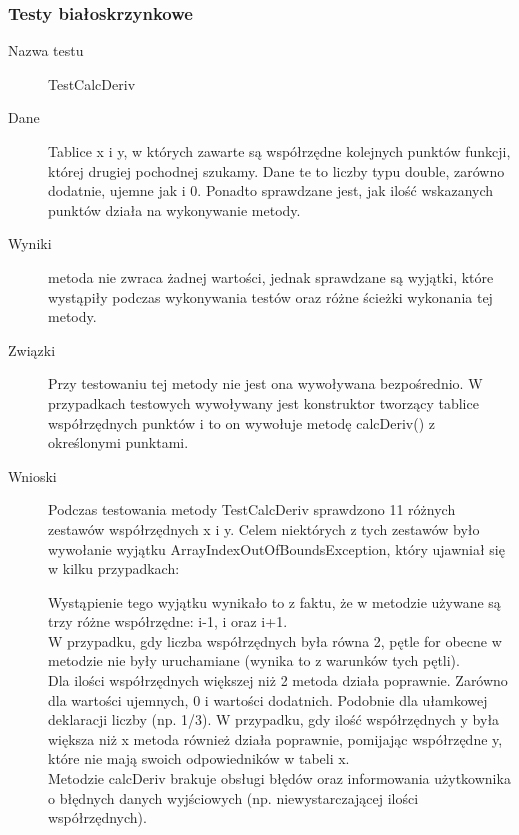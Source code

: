 \documentclass[12pt,a4paper,notitlepage]{article}
\begin{document}
\subsubsection{Testy białoskrzynkowe}
\begin{description}
\item [Nazwa testu] TestCalcDeriv
\item [Dane] Tablice x i y, w których zawarte są współrzędne kolejnych punktów funkcji, której drugiej pochodnej szukamy. Dane te to liczby typu double, zarówno dodatnie, ujemne jak i 0. Ponadto sprawdzane jest, jak ilość wskazanych punktów działa na wykonywanie metody.
\item [Wyniki] metoda nie zwraca żadnej wartości, jednak sprawdzane są wyjątki, które wystąpiły podczas wykonywania testów oraz różne ścieżki wykonania tej metody.
\item [Związki] Przy testowaniu tej metody nie jest ona wywoływana bezpośrednio. W przypadkach testowych wywoływany jest konstruktor tworzący tablice współrzędnych punktów i to on wywołuje metodę calcDeriv() z określonymi punktami.
\item [Wnioski] Podczas testowania metody TestCalcDeriv sprawdzono 11 różnych zestawów współrzędnych x i y. Celem niektórych z tych zestawów było wywołanie wyjątku ArrayIndexOutOfBoundsException, który ujawniał się w kilku przypadkach:
Wystąpienie tego wyjątku wynikało to z faktu, że w metodzie używane są trzy różne współrzędne: i-1, i oraz i+1.\\
W przypadku, gdy liczba współrzędnych była równa 2, pętle for obecne w metodzie nie były uruchamiane (wynika to z warunków tych pętli).\\
Dla ilości współrzędnych większej niż 2 metoda działa poprawnie. Zarówno dla wartości ujemnych, 0 i wartości dodatnich. Podobnie dla ułamkowej deklaracji liczby (np. 1/3). W przypadku, gdy ilość współrzędnych y była większa niż x metoda również działa poprawnie, pomijając współrzędne y, które nie mają swoich odpowiedników w tabeli x.\\
Metodzie calcDeriv brakuje obsługi błędów oraz informowania użytkownika o błędnych danych wyjściowych (np. niewystarczającej ilości współrzędnych). 
\end{description}
\end{document}
